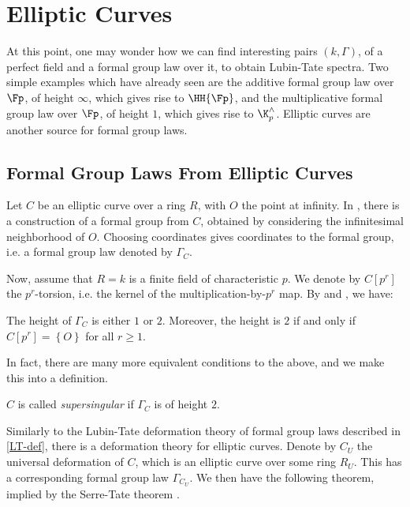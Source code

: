 \section{Elliptic Curves}

At this point, one may wonder how we can find interesting pairs $\left(k, \Gamma\right)$, of a perfect field and a formal group law over it, to obtain Lubin-Tate spectra.
Two simple examples which have already seen are the additive formal group law over $\Fp$, of height $\infty$, which gives rise to $\HH{\Fp}$, and the multiplicative formal group law over $\Fp$, of height $1$, which gives rise to $\K_p^\wedge$.
Elliptic curves are another source for formal group laws.



\subsection{Formal Group Laws From Elliptic Curves}

Let $C$ be an elliptic curve over a ring $R$, with $O$ the point at infinity.
In \cite[IV]{Sil}, there is a construction of a formal group from $C$, obtained by considering the infinitesimal neighborhood of $O$.
Choosing coordinates gives coordinates to the formal group, i.e. a formal group law denoted by $\Gamma_C$.

Now, assume that $R = k$ is a finite field of characteristic $p$.
We denote by $C\left[p^r\right]$ the $p^r$-torsion, i.e. the kernel of the multiplication-by-$p^r$ map.
By \cite[IV.7.5]{Sil} and \cite[V.3.1]{Sil}, we have:

\begin{proposition}
	The height of $\Gamma_C$ is either $1$ or $2$.
	Moreover, the height is $2$ if and only if $C\left[p^r\right] = \left\{ O \right\}$ for all $r \geq 1$.
\end{proposition}

In fact, there are many more equivalent conditions to the above, and we make this into a definition.

\begin{definition}
	$C$ is called \emph{supersingular} if $\Gamma_C$ is of height $2$.
\end{definition}

Similarly to the Lubin-Tate deformation theory of formal group laws described in \ref{LT-def}, there is a deformation theory for elliptic curves.
Denote by $C_U$ the universal deformation of $C$, which is an elliptic curve over some ring $R_U$.
This has a corresponding formal group law $\Gamma_{C_U}$.
We then have the following theorem, implied by the Serre-Tate theorem \cite[1.2.1]{ST}.

